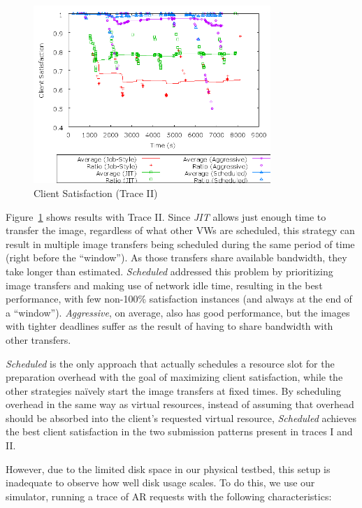\begin{figure}
  \begin{center}
    \includegraphics[width=0.8\textwidth]{figures/ClientSatisfaction-ClusteredStartTimes.png}
    \caption{Client Satisfaction (Trace II)}
	\label{fig:clientsatisfactionII}
  \end{center}
\end{figure}

Figure~\ref{fig:clientsatisfactionII} shows results with Trace II. Since \emph{JIT} allows just
enough time to transfer the image, regardless of what other VWs are
scheduled, this strategy can result in multiple image transfers being
scheduled during the same period of time (right before the ``window'').
As those transfers share available bandwidth, they take longer than
estimated. \emph{Scheduled} addressed this problem by prioritizing image
transfers and making use of network idle time, resulting in the best
performance, with few non{}-100\% satisfaction instances (and always at
the end of a ``window''). \emph{Aggressive}, on average, also has
good performance, but the images with tighter deadlines suffer as the
result of having to share bandwidth with other transfers.

\emph{Scheduled} is the only approach that
actually schedules a resource slot for the preparation overhead with
the goal of maximizing client satisfaction, while the other strategies
na\"ively start the image transfers at fixed times. By scheduling
overhead in the same way as virtual resources, instead of assuming that
overhead should be absorbed into the client's requested virtual
resource, \emph{Scheduled} achieves the best client satisfaction in the
two submission patterns present in traces I and II.

However, due to the limited disk space in our physical testbed, this setup is inadequate to observe how well disk usage scales. To do this, we use our simulator, running a trace of AR requests with the following characteristics:

